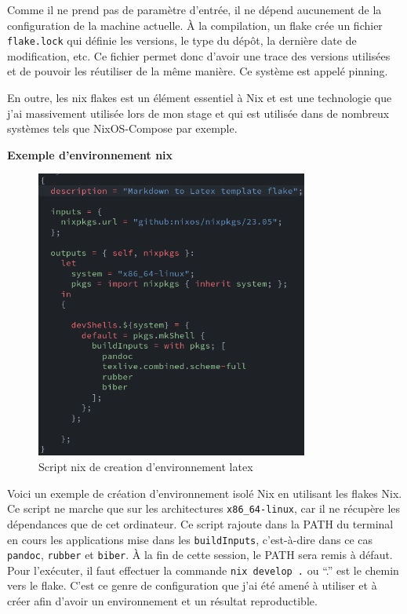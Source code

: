 \documentclass[a4paper,french,12pt, titlepage]{article}
\begin{document}
Comme il ne prend pas de paramètre d'entrée, il ne dépend aucunement de
la configuration de la machine actuelle. À la compilation, un flake crée
un fichier \texttt{flake.lock} qui définie les versions, le type du
dépôt, la dernière date de modification, etc. Ce fichier permet donc
d'avoir une trace des versions utilisées et de pouvoir les réutiliser de
la même manière. Ce système est appelé \gls{pinning}.\newline

En outre, les nix flakes est un élément essentiel à Nix et est une
technologie que j'ai massivement utilisée lors de mon stage et qui est
utilisée dans de nombreux systèmes tels que NixOS-Compose par
exemple.\newline

\textbf{Exemple d'environnement nix}\newline

\begin{figure}[h]
\centering
\includegraphics[width=0.8\textwidth,height=0.8\textheight,keepaspectratio]{images/flakebasenix.png}
\caption{Script nix de creation d'environnement latex}
\end{figure}

Voici un exemple de création d'environnement isolé Nix en utilisant les
flakes Nix. Ce script ne marche que sur les architectures
\texttt{x86\_64-linux}, car il ne récupère les dépendances que de cet
ordinateur. Ce script rajoute dans la PATH du terminal en cours les
applications mise dans les \texttt{buildInputs}, c'est-à-dire dans ce
cas \texttt{pandoc}, \texttt{rubber} et \texttt{biber}. À la fin de
cette session, le PATH sera remis à défaut. Pour l'exécuter, il faut
effectuer la commande \texttt{nix\ develop\ .} ou ``.'' est le chemin
vers le flake. C'est ce genre de configuration que j'ai été amené à
utiliser et à créer afin d'avoir un environnement et un résultat
reproductible.\newline
\end{document}
